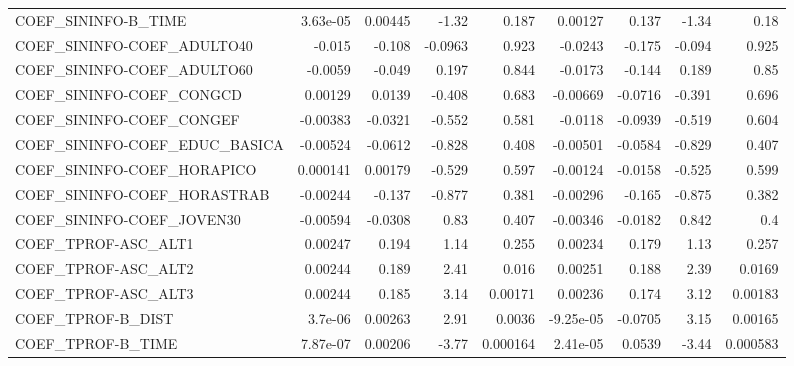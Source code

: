 \begin{tabular}{lrrrrrrrr}
COEF\_SININFO-B\_TIME               &    3.63e-05 &      0.00445 &   -1.32 &    0.187 &    0.00127 &       0.137 &        -1.34 &          0.18 \\
COEF\_SININFO-COEF\_ADULTO40        &      -0.015 &       -0.108 & -0.0963 &    0.923 &    -0.0243 &      -0.175 &       -0.094 &         0.925 \\
COEF\_SININFO-COEF\_ADULTO60        &     -0.0059 &       -0.049 &   0.197 &    0.844 &    -0.0173 &      -0.144 &        0.189 &          0.85 \\
COEF\_SININFO-COEF\_CONGCD          &     0.00129 &       0.0139 &  -0.408 &    0.683 &   -0.00669 &     -0.0716 &       -0.391 &         0.696 \\
COEF\_SININFO-COEF\_CONGEF          &    -0.00383 &      -0.0321 &  -0.552 &    0.581 &    -0.0118 &     -0.0939 &       -0.519 &         0.604 \\
COEF\_SININFO-COEF\_EDUC\_BASICA     &    -0.00524 &      -0.0612 &  -0.828 &    0.408 &   -0.00501 &     -0.0584 &       -0.829 &         0.407 \\
COEF\_SININFO-COEF\_HORAPICO        &    0.000141 &      0.00179 &  -0.529 &    0.597 &   -0.00124 &     -0.0158 &       -0.525 &         0.599 \\
COEF\_SININFO-COEF\_HORASTRAB       &    -0.00244 &       -0.137 &  -0.877 &    0.381 &   -0.00296 &      -0.165 &       -0.875 &         0.382 \\
COEF\_SININFO-COEF\_JOVEN30         &    -0.00594 &      -0.0308 &    0.83 &    0.407 &   -0.00346 &     -0.0182 &        0.842 &           0.4 \\
COEF\_TPROF-ASC\_ALT1               &     0.00247 &        0.194 &    1.14 &    0.255 &    0.00234 &       0.179 &         1.13 &         0.257 \\
COEF\_TPROF-ASC\_ALT2               &     0.00244 &        0.189 &    2.41 &    0.016 &    0.00251 &       0.188 &         2.39 &        0.0169 \\
COEF\_TPROF-ASC\_ALT3               &     0.00244 &        0.185 &    3.14 &  0.00171 &    0.00236 &       0.174 &         3.12 &       0.00183 \\
COEF\_TPROF-B\_DIST                 &     3.7e-06 &      0.00263 &    2.91 &   0.0036 &  -9.25e-05 &     -0.0705 &         3.15 &       0.00165 \\
COEF\_TPROF-B\_TIME                 &    7.87e-07 &      0.00206 &   -3.77 & 0.000164 &   2.41e-05 &      0.0539 &        -3.44 &      0.000583 \\

\end{tabular}
